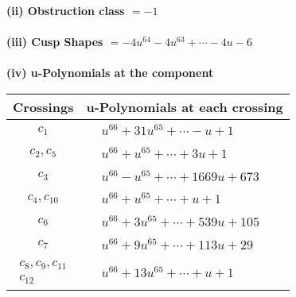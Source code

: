 \documentclass[1p]{elsarticle_modified}
\theoremstyle{definition}
\begin{document}
\flushleft \textbf{(ii) Obstruction class $= -1$}\\~\\
\flushleft \textbf{(iii) Cusp Shapes $= -4 u^{64}-4 u^{63}+\cdots-4 u-6$}\\~\\
\newpage\renewcommand{\arraystretch}{1}
\flushleft \textbf{(iv) u-Polynomials at the component}\newline \\
\begin{tabular}{m{50pt}|m{274pt}}
Crossings & \hspace{64pt}u-Polynomials at each crossing \\
\hline $$\begin{aligned}c_{1}\end{aligned}$$&$\begin{aligned}
&u^{66}+31 u^{65}+\cdots- u+1
\end{aligned}$\\
\hline $$\begin{aligned}c_{2},c_{5}\end{aligned}$$&$\begin{aligned}
&u^{66}+u^{65}+\cdots+3 u+1
\end{aligned}$\\
\hline $$\begin{aligned}c_{3}\end{aligned}$$&$\begin{aligned}
&u^{66}- u^{65}+\cdots+1669 u+673
\end{aligned}$\\
\hline $$\begin{aligned}c_{4},c_{10}\end{aligned}$$&$\begin{aligned}
&u^{66}+u^{65}+\cdots+u+1
\end{aligned}$\\
\hline $$\begin{aligned}c_{6}\end{aligned}$$&$\begin{aligned}
&u^{66}+3 u^{65}+\cdots+539 u+105
\end{aligned}$\\
\hline $$\begin{aligned}c_{7}\end{aligned}$$&$\begin{aligned}
&u^{66}+9 u^{65}+\cdots+113 u+29
\end{aligned}$\\
\hline $$\begin{aligned}c_{8},c_{9},c_{11}\\c_{12}\end{aligned}$$&$\begin{aligned}
&u^{66}+13 u^{65}+\cdots+u+1
\end{aligned}$\\
\hline
\end{tabular}\\~\\
\end{document}
